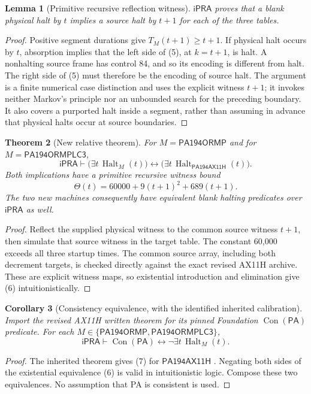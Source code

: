 \documentclass[11pt,a4paper]{article}
\newtheorem{theorem}{Theorem}[section]
\newtheorem{lemma}[theorem]{Lemma}
\newtheorem{corollary}[theorem]{Corollary}
\newcommand{\ipra}{\mathsf{iPRA}}
\newcommand{\PA}{\mathsf{PA}}
\newcommand{\Con}{\operatorname{Con}}
\newcommand{\Halt}{\operatorname{Halt}}
\newcommand{\Mone}{\mathsf{PA194ORMP}}
\newcommand{\Mtwo}{\mathsf{PA194ORMPLC3}}
\newcommand{\Mbase}{\mathsf{PA194AX11H}}
\begin{document}
\begin{lemma}[Primitive recursive reflection witness]
$\ipra$ proves that a blank physical halt by $t$ implies a source halt
by $t+1$ for each of the three tables.
\end{lemma}
\begin{proof}
Positive segment durations give $T_M(t+1)\ge t+1$. If physical halt
occurs by $t$, absorption implies that the left side of (5), at
$k=t+1$, is halt. A nonhalting source frame has control 84, and so its
encoding is different from halt. The right side of (5) must therefore
be the encoding of source halt. The argument is a finite numerical
case distinction and uses the explicit witness $t+1$; it invokes neither
Markov's principle nor an unbounded search for the preceding boundary.
It also covers a purported halt inside a segment, rather than assuming
in advance that physical halts occur at source boundaries.
\end{proof}

\begin{theorem}[New relative theorem]
For $M=\Mone$ and for $M=\Mtwo$,
\[
\ipra\vdash
 \bigl(\exists t\,\Halt_M(t)\bigr)
 \longleftrightarrow
 \bigl(\exists t\,\Halt_{\Mbase}(t)\bigr).          \tag{6}
\]
Both implications have a primitive recursive witness bound
\[
\Theta(t)=60000+9(t+1)^2+689(t+1).
\]
The two new machines consequently have equivalent blank halting predicates
over $\ipra$ as well.
\end{theorem}
\begin{proof}
Reflect the supplied physical witness to the common source witness
$t+1$, then simulate that source witness in the target table. The
constant 60,000 exceeds all three startup times. The common source
array, including both decrement targets, is checked directly against
the exact revised AX11H archive. These are explicit witness maps, so
existential introduction and elimination give (6) intuitionistically.
\end{proof}

\begin{corollary}[Consistency equivalence, with the identified inherited calibration]
Import the revised AX11H written theorem for its pinned Foundation
$\Con(\PA)$ predicate. For each $M\in\{\Mone,\Mtwo\}$,
\[
             \ipra\vdash\Con(\PA)\longleftrightarrow
                  \neg\exists t\,\Halt_M(t).       \tag{7}
\]
\end{corollary}
\begin{proof}
The inherited theorem gives (7) for $\Mbase$ \cite{ax11h}. Negating
both sides of the existential equivalence (6) is valid in intuitionistic
logic. Compose these two equivalences. No assumption that PA is consistent
is used.
\end{proof}
\end{document}
